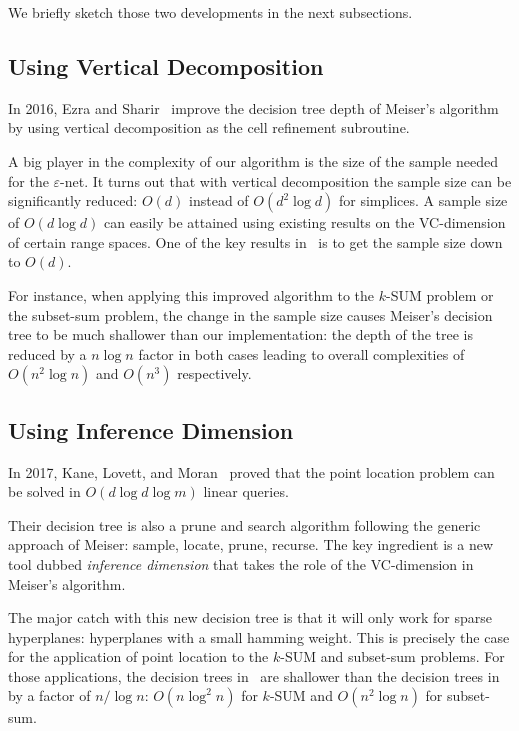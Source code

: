 We briefly sketch those two developments in the next subsections.

\subsection{Using Vertical Decomposition}%
\label{sec:developments:ksum-algorithm:ES17}

In 2016, Ezra and Sharir~\cite{ES17} improve the decision tree depth of
Meiser's algorithm by using vertical decomposition as the cell refinement
subroutine.

A big player in the complexity of our algorithm is the size of the sample
needed for the \(\varepsilon\)-net. It turns out that with
vertical decomposition the sample size can be significantly reduced: $O(d)$
instead of $O(d^2 \log d)$ for simplices.
%
A sample size of $O(d \log d)$ can easily be attained using existing results on
the VC-dimension of certain range spaces. One of the key results in~\cite{ES17}
is to get the sample size down to $O(d)$.

For instance,
when applying this improved algorithm to the \(k\)-SUM problem or the
subset-sum problem,
the change in the sample size causes Meiser's decision tree to be
much shallower than our implementation:
the depth of the tree is reduced by a \(n \log n\) factor in both cases leading
to overall complexities of \(O(n^2 \log n)\) and \(O(n^3)\) respectively.

\subsection{Using Inference Dimension}%
\label{sec:developments:ksum-algorithm:KLM18}

In 2017, Kane, Lovett, and Moran~\cite{KLM18} proved that the point location
problem can be solved in \(O(d \log d \log m)\) linear queries.

Their decision tree is also a prune and search algorithm following
the generic approach of Meiser: sample, locate,
prune, recurse. The key ingredient is a new tool dubbed \emph{inference
dimension} that takes the role of the VC-dimension in Meiser's algorithm.

The major catch with this new decision tree is that it will only work for
sparse hyperplanes: hyperplanes with a small hamming weight. This is precisely
the case for the application of point location to the \(k\)-SUM and subset-sum
problems. For those applications, the decision trees in~\cite{KLM18} are shallower than the
decision trees in~\cite{ES17} by a factor of $n / \log n$:
$O(n \log^2 n)$ for \(k\)-SUM and \(O(n^2 \log n)\) for subset-sum.


